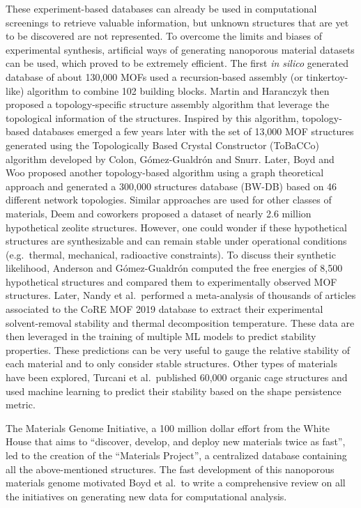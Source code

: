 \documentclass[main.tex]{subfiles}
\begin{document}
These experiment-based databases can already be used in computational screenings to retrieve valuable information, but unknown structures that are yet to be discovered are not represented. To overcome the limits and biases of experimental synthesis, artificial ways of generating nanoporous material datasets can be used, which proved to be extremely efficient. The first \emph{in silico} generated database of about 130,000 MOFs used a recursion-based assembly (or tinkertoy-like) algorithm to combine 102 building blocks.\cite{Wilmer_2012} Martin and Haranczyk then proposed a topology-specific structure assembly algorithm that leverage the topological information of the structures.\cite{Martin_2014} Inspired by this algorithm, topology-based databases emerged a few years later with the set of 13,000 MOF structures generated using the Topologically Based Crystal Constructor (ToBaCCo) algorithm developed by Colon, G{\'{o}}mez-Gualdr{\'{o}}n and Snurr.\cite{Colon_2017}
Later, Boyd and Woo proposed another topology-based algorithm using a graph theoretical approach and generated a 300,000 structures database (BW-DB) based on 46 different network topologies.\cite{Boyd_2016}
Similar approaches are used for other classes of materials, Deem and coworkers proposed a dataset of nearly 2.6 million hypothetical zeolite structures.\cite{Earl_2006,Deem_2009,Pophale_2011}
However, one could wonder if these hypothetical structures are synthesizable and can remain stable under operational conditions (e.g.\ thermal, mechanical, radioactive constraints). To discuss their synthetic likelihood, Anderson and G{\'{o}}mez-Gualdr{\'{o}}n computed the free energies of 8,500 hypothetical structures and compared them to experimentally observed MOF structures.\cite{Anderson_2020}
Later, Nandy et al.\ performed a meta-analysis of thousands of articles associated to the CoRE MOF 2019 database to extract their experimental solvent-removal stability and thermal decomposition temperature.\cite{Nandy_2021} These data are then leveraged in the training of multiple ML models to predict stability properties. These predictions can be very useful to gauge the relative stability of each material and to only consider stable structures. Other types of materials have been explored, Turcani et al.\ published 60,000 organic cage structures and used machine learning to predict their stability based on the shape persistence metric.\cite{Turcani_2018}

The Materials Genome Initiative, a 100 million dollar effort from the White House that aims to ``discover, develop, and deploy new materials twice as fast'', led to the creation of the ``Materials Project'', a centralized database containing all the above-mentioned structures.\cite{kalil2011national,Matgenome,Jain_2013}
The fast development of this nanoporous materials genome motivated Boyd et al.\ to write a comprehensive review on all the initiatives on generating new data for computational analysis.\cite{Boyd_2017}
\end{document}
